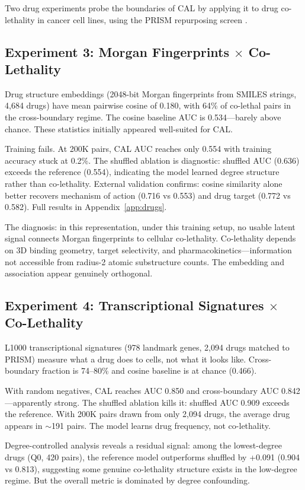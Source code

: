 \documentclass[11pt]{article}
\begin{document}
Two drug experiments probe the boundaries of CAL by applying it to drug co-lethality in cancer cell lines, using the PRISM repurposing screen \citep{corsello2020prism}.

\subsection{Experiment 3: Morgan Fingerprints $\times$ Co-Lethality}

Drug structure embeddings (2048-bit Morgan fingerprints from SMILES strings, 4,684 drugs) have mean pairwise cosine of 0.180, with 64\% of co-lethal pairs in the cross-boundary regime. The cosine baseline AUC is 0.534---barely above chance. These statistics initially appeared well-suited for CAL.

Training fails. At 200K pairs, CAL AUC reaches only 0.554 with training accuracy stuck at 0.2\%. The shuffled ablation is diagnostic: shuffled AUC (0.636) exceeds the reference (0.554), indicating the model learned degree structure rather than co-lethality. External validation confirms: cosine similarity alone better recovers mechanism of action (0.716 vs 0.553) and drug target (0.772 vs 0.582). Full results in Appendix~\ref{app:drugs}.

The diagnosis: in this representation, under this training setup, no usable latent signal connects Morgan fingerprints to cellular co-lethality. Co-lethality depends on 3D binding geometry, target selectivity, and pharmacokinetics---information not accessible from radius-2 atomic substructure counts. The embedding and association appear genuinely orthogonal.

\subsection{Experiment 4: Transcriptional Signatures $\times$ Co-Lethality}

L1000 transcriptional signatures (978 landmark genes, 2,094 drugs matched to PRISM) measure what a drug does to cells, not what it looks like. Cross-boundary fraction is 74--80\% and cosine baseline is at chance (0.466).

With random negatives, CAL reaches AUC 0.850 and cross-boundary AUC 0.842---apparently strong. The shuffled ablation kills it: shuffled AUC 0.909 exceeds the reference. With 200K pairs drawn from only 2,094 drugs, the average drug appears in $\sim$191 pairs. The model learns drug frequency, not co-lethality.

Degree-controlled analysis reveals a residual signal: among the lowest-degree drugs (Q0, 420 pairs), the reference model outperforms shuffled by +0.091 (0.904 vs 0.813), suggesting some genuine co-lethality structure exists in the low-degree regime. But the overall metric is dominated by degree confounding.
\end{document}
